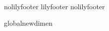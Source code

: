\def\EndLilyPondOutput{
  \ifundefined{lilypondpaperlastpagefill}
    \vskip 0pt plus \lilypondpaperinterscorelinefill00 fill
  \fi
  \csname bye\endcsname
}


\ifx\csname nolilyfooter\endcsname\relax
  \csname lilyfooter\texsuffix\endcsname
\else
  \csname nolilyfooter\texsuffix\endcsname
\fi

\ifx\outputscale\undefined
  \csname global\endcsname\csname newdimen\endcsname\outputscale
\fi

\else
  \endlinechar \lilyponddefsELC
  \expandafter\endinput
\fi

\newdimen\scoreshift

\endlinechar \lilyponddefsELC
\endinput
